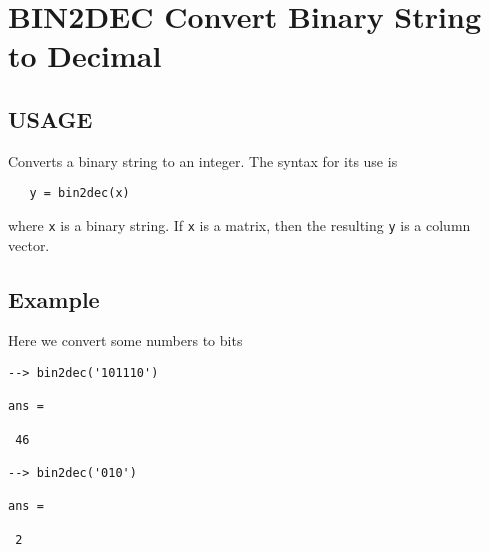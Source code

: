 \section{BIN2DEC Convert Binary String to Decimal}

\subsection{USAGE}

Converts a binary string to an integer.  The syntax for its
use is
\begin{verbatim}
   y = bin2dec(x)
\end{verbatim}
where \verb|x| is a binary string. If \verb|x| is a matrix, then the resulting 
\verb|y| is a column vector.
\subsection{Example}

Here we convert some numbers to bits
\begin{verbatim}
--> bin2dec('101110')

ans = 

 46 

--> bin2dec('010')

ans = 

 2 
\end{verbatim}
